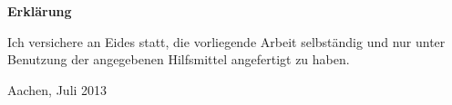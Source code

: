 \begin{titlepage}


\vspace*{4cm}
\begin{center}
\parbox{10,5cm}
{
{\large \textbf{\textsf{Erklärung}}}

\vspace*{3em}
	Ich versichere an Eides statt, die vorliegende Arbeit selbständig und nur unter Benutzung
	der angegebenen Hilfsmittel angefertigt zu haben.

\vspace*{6em}
Aachen, Juli 2013
}
\end{center}
\end{titlepage}
\cleardoublepage




